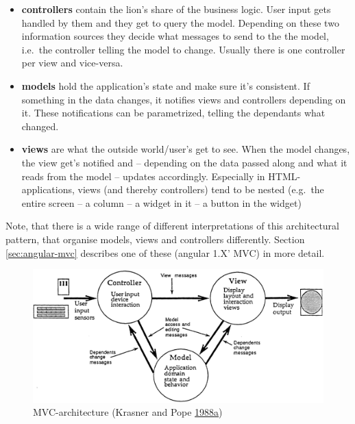 \documentclass[a4paper,,tablecaptionabove]{scrbook}
\providecommand{\tightlist}{%
  \setlength{\itemsep}{0pt}\setlength{\parskip}{0pt}}
\begin{document}
\begin{itemize}
\tightlist
\item
  \textbf{controllers} contain the lion's share of the business logic.
  User input gets handled by them and they get to query the model.
  Depending on these two information sources they decide what messages
  to send to the the model, i.e.~the controller telling the model to
  change. Usually there is one controller per view and vice-versa.
\item
  \textbf{models} hold the application's state and make sure it's
  consistent. If something in the data changes, it notifies views and
  controllers depending on it. These notifications can be parametrized,
  telling the dependants what changed.
\item
  \textbf{views} are what the outside world/user's get to see. When the
  model changes, the view get's notified and -- depending on the data
  passed along and what it reads from the model -- updates accordingly.
  Especially in HTML-applications, views (and thereby controllers) tend
  to be nested (e.g.~the entire screen -- a column -- a widget in it --
  a button in the widget)
\end{itemize}

Note, that there is a wide range of different interpretations of this
architectural pattern, that organise models, views and controllers
differently. Section \ref{sec:angular-mvc} describes one of these
(angular 1.X' MVC) in more detail.

\begin{figure}
\hypertarget{fig:mvc}{%
\centering
\includegraphics{./tex2pdf.11982/4392ac73b7368e734eb911fc5ec7524829e995aa.png}
\caption{MVC-architecture (Krasner and Pope
\protect\hyperlink{ref-Krasnerdescriptionmodelviewcontrolleruser1988}{1988}\protect\hyperlink{ref-Krasnerdescriptionmodelviewcontrolleruser1988}{a})}\label{fig:mvc}
}
\end{figure}
\end{document}
